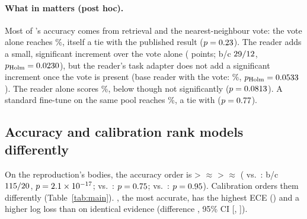 \paragraph{What in \orb{} matters (post hoc).} Most of \orb's accuracy comes from retrieval and the nearest-neighbour
vote: the vote alone reaches \fsKnnAloneAcc\%, itself a tie with the published \jev{} result
($p=0.23$). The reader adds a small, significant increment over the vote alone
(\fsCleanMinusKnnAlonePt{} points; b/c $29/12$,
$p_\text{Holm}=0.0230$), but the reader's task adapter does not add a significant increment once
the vote is present (base reader with the vote: \fsBaseKnnAcc\%, $p_\text{Holm}=0.0533$). The
reader alone scores \fsReaderAloneAcc\%, below \jev{} though not significantly ($p=0.0813$).
A standard fine-tune on the same pool reaches \fsFtAcc\%, a tie with \orb{} ($p=0.77$).

\subsection{Accuracy and calibration rank models differently}
\label{sec:res-calibration}
On the reproduction's bodies, the accuracy order is \flash{} > \clef{} $\approx$ \pplx{} > \jev{} $\approx$ \orb{}
(\flash{} vs.\ \jev: b/c $115/20$, $p=2.1\times10^{-17}$; \clef{} vs.\ \pplx:
$p=0.75$; \orb{} vs.\ \jev: $p=0.95$). Calibration orders them differently
(Table~\ref{tab:main}). \flash{}, the most accurate, has the highest ECE (\fsFlashEce) and a higher log loss than
\orb{} on identical evidence (difference \fsLlParMinusFlash, 95\% CI %
 [\fsLlParMinusFlashLo, \fsLlParMinusFlashHi]).

